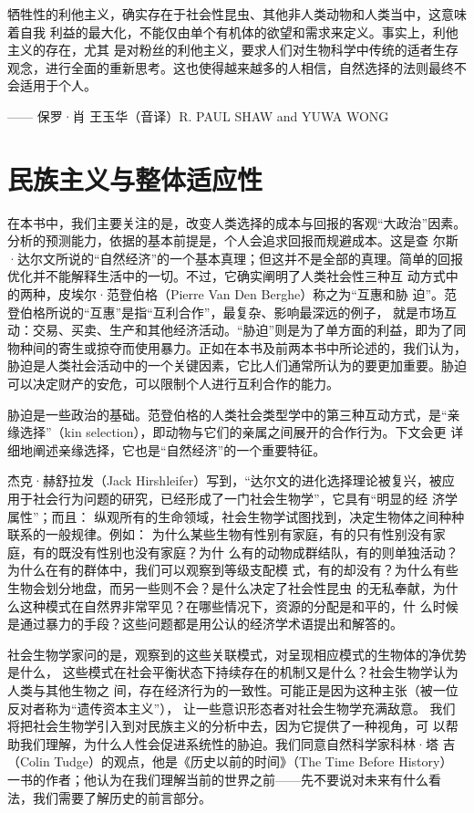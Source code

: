 \begin{tcolorbox}
牺牲性的利他主义，确实存在于社会性昆虫、其他非人类动物和人类当中，这意味着自我 利益的最大化，不能仅由单个有机体的欲望和需求来定义。事实上，利他主义的存在，尤其 是对粉丝的利他主义，要求人们对生物科学中传统的适者生存观念，进行全面的重新思考。这也使得越来越多的人相信，自然选择的法则最终不会适用于个人。
\begin{flushright}
—— 保罗·肖 王玉华（音译）R. PAUL SHAW and YUWA WONG  
\end{flushright}
\end{tcolorbox}

\section{民族主义与整体适应性}

在本书中，我们主要关注的是，改变人类选择的成本与回报的客观“大政治”因素。分析的预测能力，依据的基本前提是，个人会追求回报而规避成本。这是查 尔斯·达尔文所说的“自然经济”的一个基本真理；但这并不是全部的真理。简单的回报优化并不能解释生活中的一切。不过，它确实阐明了人类社会性三种互 动方式中的两种，皮埃尔·范登伯格（Pierre Van Den Berghe）称之为“互惠和胁 迫”。范登伯格所说的“互惠”是指“互利合作”，最复杂、影响最深远的例子， 就是市场互动：交易、买卖、生产和其他经济活动。“胁迫”则是为了单方面的利益，即为了同物种间的寄生或掠夺而使用暴力。正如在本书及前两本书中所论述的，我们认为，胁迫是人类社会活动中的一个关键因素，它比人们通常所认为的要更加重要。胁迫可以决定财产的安危，可以限制个人进行互利合作的能力。

胁迫是一些政治的基础。范登伯格的人类社会类型学中的第三种互动方式，是“亲 缘选择”（kin selection），即动物与它们的亲属之间展开的合作行为。下文会更 详细地阐述亲缘选择，它也是“自然经济”的一个重要特征。

杰克·赫舒拉发（Jack Hirshleifer）写到，“达尔文的进化选择理论被复兴，被应用于社会行为问题的研究，已经形成了一门社会生物学”，它具有“明显的经 济学属性”；而且： 纵观所有的生命领域，社会生物学试图找到，决定生物体之间种种联系的一般规律。例如： 为什么某些生物有性别有家庭，有的只有性别没有家庭，有的既没有性别也没有家庭？为什 么有的动物成群结队，有的则单独活动？为什么在有的群体中，我们可以观察到等级支配模 式，有的却没有？为什么有些生物会划分地盘，而另一些则不会？是什么决定了社会性昆虫 的无私奉献，为什么这种模式在自然界非常罕见？在哪些情况下，资源的分配是和平的，什 么时候是通过暴力的手段？这些问题都是用公认的经济学术语提出和解答的。

社会生物学家问的是，观察到的这些关联模式，对呈现相应模式的生物体的净优势是什么， 这些模式在社会平衡状态下持续存在的机制又是什么？社会生物学认为人类与其他生物之  间，存在经济行为的一致性。可能正是因为这种主张（被一位反对者称为“遗传资本主义”）， 让一些意识形态者对社会生物学充满敌意。 我们将把社会生物学引入到对民族主义的分析中去，因为它提供了一种视角，可 以帮助我们理解，为什么人性会促进系统性的胁迫。我们同意自然科学家科林·塔 吉（Colin Tudge）的观点，他是《历史以前的时间》（The Time Before History） 一书的作者；他认为在我们理解当前的世界之前——先不要说对未来有什么看 法，我们需要了解历史的前言部分。

